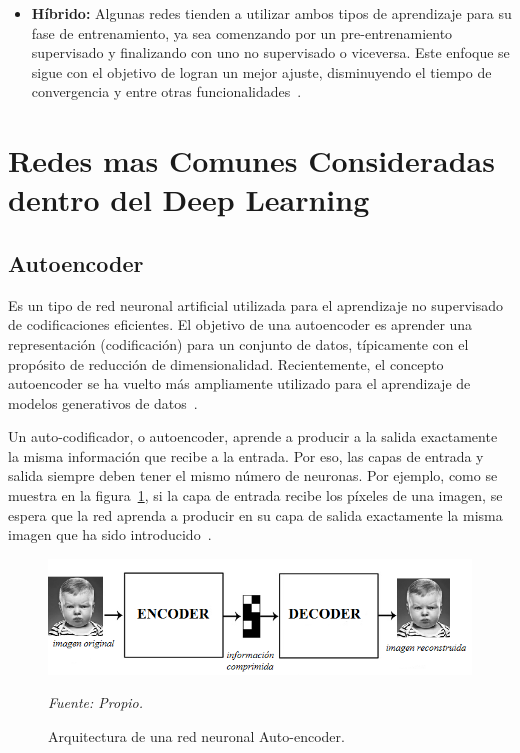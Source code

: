 \begin{itemize}
\item \textbf{Híbrido: }
Algunas redes tienden a utilizar ambos tipos de aprendizaje para su fase de entrenamiento, ya sea comenzando por un pre-entrenamiento supervisado y finalizando con uno no supervisado o viceversa. Este enfoque se sigue con el objetivo de logran un mejor ajuste, disminuyendo el tiempo de convergencia y entre otras funcionalidades~\cite{18restrepo2015aplicacion}.
\end{itemize}

\section{Redes mas Comunes Consideradas dentro del Deep Learning}
\subsection{Autoencoder}
Es un tipo de red neuronal artificial utilizada para el aprendizaje no supervisado de codificaciones eficientes. El objetivo de una autoencoder es aprender una representación (codificación) para un conjunto de datos, típicamente con el propósito de reducción de dimensionalidad. Recientemente, el concepto autoencoder se ha vuelto más ampliamente utilizado para el aprendizaje de modelos generativos de datos~\cite{28fAutoencoder}.

Un auto-codificador, o autoencoder, aprende a producir a la salida exactamente la misma información que recibe a la entrada. Por eso, las capas de entrada y salida siempre deben tener el mismo número de neuronas. Por ejemplo, como se muestra en la figura~\ref{fig:autoencoder}, si la capa de entrada recibe los píxeles de una imagen, se espera que la red aprenda a producir en su capa de salida exactamente la misma imagen que ha sido introducido~\cite{18restrepo2015aplicacion}.

\begin{figure}[H]
		\centering
		\includegraphics[width=150mm]{Imagenes/autoenconder.png}
		\caption{Arquitectura de una red neuronal Auto-encoder.}
		\vspace{0.15cm}
		\textit{Fuente: Propio.}
		\label{fig:autoencoder}
\end{figure}

